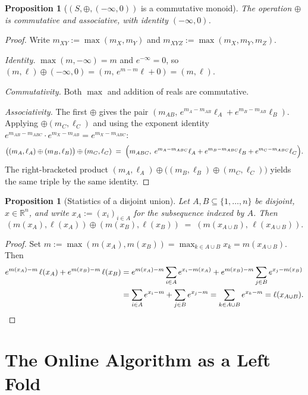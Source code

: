 \documentclass[11pt]{amsart}
\theoremstyle{plain}
\newtheorem{proposition}[theorem]{Proposition}
\theoremstyle{definition}
\newcommand{\R}{\mathbb{R}}
\begin{document}
\begin{proposition}[$(S,\oplus,(-\infty,0))$ is a commutative monoid]
\label{prop:merge-monoid}
The operation $\oplus$ is commutative and associative, with identity
$(-\infty, 0)$.
\end{proposition}
\begin{proof}
Write $m_{XY} := \max(m_X, m_Y)$ and $m_{XYZ} := \max(m_X, m_Y, m_Z)$.

\textit{Identity.}  $\max(m,-\infty) = m$ and $e^{-\infty} = 0$, so
$(m,\ell)\oplus(-\infty,0) = (m,\, e^{m-m}\ell + 0) = (m,\ell)$.

\textit{Commutativity.}  Both $\max$ and addition of reals are commutative.

\textit{Associativity.}  The first $\oplus$ gives the pair
$(m_{AB},\, e^{m_A-m_{AB}}\ell_A + e^{m_B-m_{AB}}\ell_B)$.
Applying $\oplus(m_C,\ell_C)$ and using the exponent identity
$e^{m_{AB}-m_{ABC}}\cdot e^{m_X-m_{AB}} = e^{m_X-m_{ABC}}$:
\[
    \bigl((m_A,\ell_A)\oplus(m_B,\ell_B)\bigr)\oplus(m_C,\ell_C)
    \;=\;
    \Bigl(m_{ABC},\;
        e^{m_A-m_{ABC}}\ell_A
        + e^{m_B-m_{ABC}}\ell_B
        + e^{m_C-m_{ABC}}\ell_C
    \Bigr).
\]
The right-bracketed product $(m_A,\ell_A)\oplus\bigl((m_B,\ell_B)\oplus(m_C,\ell_C)\bigr)$
yields the same triple by the same identity.
\end{proof}

\begin{proposition}[Statistics of a disjoint union]
\label{prop:merge-correct}
Let $A,B \subseteq \{1,\ldots,n\}$ be disjoint, $x \in \R^n$, and write
$x_A := (x_i)_{i\in A}$ for the subsequence indexed by $A$.  Then
\[
    (m(x_A),\ell(x_A)) \oplus (m(x_B),\ell(x_B))
    \;=\;
    (m(x_{A\cup B}),\,\ell(x_{A\cup B})).
\]
\end{proposition}
\begin{proof}
Set $m := \max(m(x_A), m(x_B)) = \max_{k\in A\cup B} x_k = m(x_{A\cup B})$.
Then
\begin{align*}
    e^{m(x_A)-m}\,\ell(x_A) + e^{m(x_B)-m}\,\ell(x_B)
    &= e^{m(x_A)-m}\sum_{i\in A}e^{x_i - m(x_A)}
     + e^{m(x_B)-m}\sum_{j\in B}e^{x_j - m(x_B)} \\
    &= \sum_{i\in A}e^{x_i-m}
     + \sum_{j\in B}e^{x_j-m}
     = \sum_{k\in A\cup B}e^{x_k-m}
     = \ell(x_{A\cup B}). \qedhere
\end{align*}
\end{proof}

\section{The Online Algorithm as a Left Fold}
\label{sec:online-fold}
\end{document}
